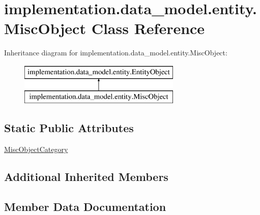 \hypertarget{classimplementation_1_1data__model_1_1entity_1_1_misc_object}{}\section{implementation.\+data\+\_\+model.\+entity.\+Misc\+Object Class Reference}
\label{classimplementation_1_1data__model_1_1entity_1_1_misc_object}
Inheritance diagram for implementation.\+data\+\_\+model.\+entity.\+Misc\+Object\+:\begin{figure}[H]
\begin{center}
\leavevmode
\includegraphics[height=2.000000cm]{classimplementation_1_1data__model_1_1entity_1_1_misc_object}
\end{center}
\end{figure}
\subsection*{Static Public Attributes}
\begin{DoxyCompactItemize}
\item 
\hyperlink{classimplementation_1_1data__model_1_1entity_1_1_misc_object_a4bc5378ce8b7877de2ffadbe3c889bcf}{Misc\+Object\+Category}
\end{DoxyCompactItemize}
\subsection*{Additional Inherited Members}


\subsection{Member Data Documentation}
\mbox{\label{classimplementation_1_1data__model_1_1entity_1_1_misc_object_a4bc5378ce8b7877de2ffadbe3c889bcf}} 

